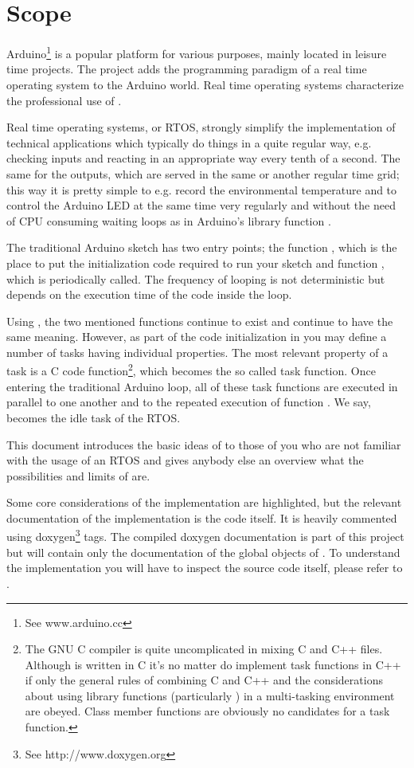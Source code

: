 \chapter{Scope}
\label{secScope}

Arduino\footnote{See www.arduino.cc} is a popular \uC{} platform for
various purposes, mainly located in leisure time projects. The \rtos{}
project adds the programming paradigm of a real time operating system to
the Arduino world. Real time operating systems characterize the
professional use of \uCs{}.

Real time operating systems, or RTOS, strongly simplify the implementation
of technical applications which typically do things in a quite regular
way, e.g. checking inputs and reacting in an appropriate way every tenth
of a second. The same for the outputs, which are served in the same or
another regular time grid; this way it is pretty simple to e.g. record the
environmental temperature and to control the Arduino LED at the same time
very regularly and without the need of CPU consuming waiting loops as
in Arduino's library function .

The traditional Arduino sketch has two entry points; the function
, which is the place to put the initialization code required
to run your sketch and function , which is periodically
called. The frequency of looping is not deterministic but depends on
the execution time of the code inside the loop.

Using \rtos{}, the two mentioned functions continue to exist and continue
to have the same meaning. However, as part of the code initialization in
 you may define a number of tasks having individual
properties. The most relevant property of a task is a C code
function\footnote{The GNU C compiler is quite uncomplicated in mixing C
and C++ files. Although \rtos{} is written in C it's no matter do
implement task functions in C++ if only the general rules of combining C
and C++ and the considerations about using library functions (particularly
) in a multi-tasking environment are obeyed. Class member
functions are obviously no candidates for a task function.}, which becomes
the so called task function. Once entering the traditional Arduino loop,
all of these task functions are executed in parallel to one another and to
the repeated execution of function . We say, 
becomes the idle task of the RTOS.

This document introduces the basic ideas of \rtos{} to those of you who are
not familiar with the usage of an RTOS and gives anybody else an overview
what the possibilities and limits of \rtos{} are.

Some core considerations of the implementation are highlighted, but the
relevant documentation of the implementation is the code itself. It is
heavily commented using doxygen\footnote{See http://www.doxygen.org} tags.
The compiled doxygen documentation is part of this project but will
contain only the documentation of the global objects of \rtos. To
understand the implementation you will have to inspect the source code
itself, please refer to .

